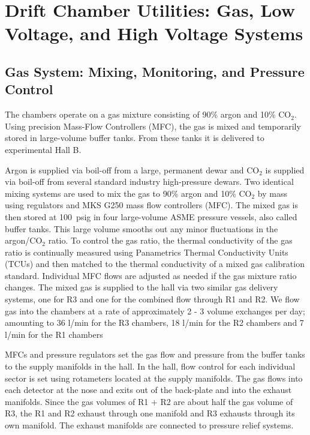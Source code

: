 \section{Drift Chamber Utilities: Gas, Low Voltage, and High Voltage Systems}
\label{utilities}

\subsection{Gas System: Mixing, Monitoring, and Pressure Control}

The chambers operate on a gas mixture consisting of 90\% argon and 10\% CO$_2$.
Using precision Mass-Flow Controllers (MFC), the gas is mixed and temporarily
stored in large-volume buffer tanks.  From these tanks it is delivered
to experimental Hall B.  

Argon is supplied via boil-off from a large, permanent dewar and CO$_2$ is supplied 
via boil-off from several standard industry high-pressure dewars.  Two identical mixing
systems are used to mix the gas to 90\% argon and 10\% CO$_2$ by mass using regulators and MKS G250 
mass flow controllers (MFC).  The mixed gas is then stored at 100~psig in four large-volume 
ASME pressure vessels, also called buffer tanks. This large volume smooths out 
any minor fluctuations in the argon/CO$_2$ ratio. To control the gas ratio, the thermal 
conductivity of the gas ratio is continually measured using Panametrics Thermal 
Conductivity Units (TCUs) and then matched to the thermal conductivity of a mixed 
gas calibration standard. Individual MFC flows are adjusted as needed if the gas mixture
ratio changes. The mixed gas is supplied to the hall via two similar gas delivery systems, 
one for R3 and one for the combined flow through R1 and R2. 
We flow gas into the chambers at a rate of approximately 2 - 3 volume exchanges per day;
amounting to 36 l/min for the R3 chambers, 18 l/min for the R2 chambers and 7 l/min
for the R1 chambers 

MFCs and pressure regulators set the gas flow and pressure from the 
buffer tanks to the supply manifolds in the hall. In the hall, flow control for each 
individual sector is set using rotameters located at the supply manifolds. The gas flows 
into each detector at the nose and exits out of the back-plate and into the exhaust 
manifolds. Since the gas volumes of R1 + R2 are about half the gas volume of R3, the R1 and R2 exhaust 
through one manifold and R3 exhausts through its own manifold. The exhaust manifolds 
are connected to pressure relief systems. 

